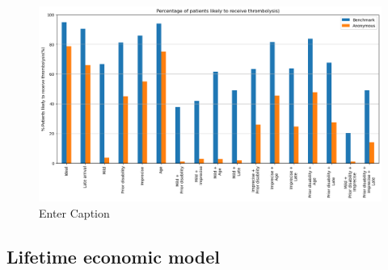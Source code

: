 \begin{figure}
    \centering
    \includegraphics[width=1\linewidth]{images/prototype_patients_team_x.png}
    \caption{Enter Caption}
    \label{fig:thrombolysis_rates_prototype_patients_team_x}
\end{figure}

\subsection{Lifetime economic model}




